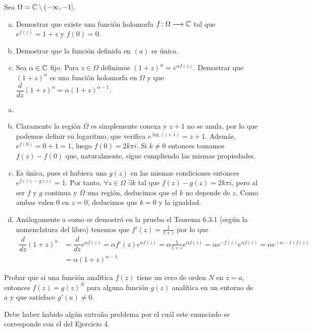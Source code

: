 \documentclass[twoside]{article}
\begin{document}
\begin{ejercicio}{8}
Sea $\Omega=\mathbb{C}\setminus(-\infty,-1]$. 
\begin{enumerate}[(a)]
\item Demostrar que existe una función holomorfa $f\colon{\Omega}\longrightarrow{\mathbb{C}}$ tal que $e^{f(z)}=1+z$ y $f(0)=0$.
\item Demostrar que la función definida en $(a)$ es única.
\item Sea $\alpha\in\mathbb{C}$ fijo. Para $z\in \Omega$ definimos $(1+z)^\alpha = e^{\alpha f(z)}$. Demostrar que $(1+z)^\alpha$ es una función holomorfa en $\Omega$ y que $\dfrac{d}{dz}(1+z)^\alpha = \alpha(1+z)^{\alpha-1}$. 
\end{enumerate}
\end{ejercicio}
\begin{solucion}
\begin{enumerate}[(a)]
\item[]
\item Claramente la región $\Omega$ es simplemente conexa y $z+1$ no se anula, por lo que podemos definir su logaritmo, que verifica $e^{\log (z+1)} = z+1$. Además, $e^{f(0)} = 0 +1 =1$, luego $f(0)=2k\pi i$. Si $k\neq 0$ entonces tomamos $f(z)-f(0)$ que, naturalmente, sigue cumpliendo las mismas propiedades.
\item Es única, pues si hubiera una $g(z)$ en las mismas condiciones entonces $e^{f(z)-g(z)} = 1$. Por tanto, $\forall z \in \Omega$ $\exists k$ tal que $f(z)-g(z)=2k\pi i$, pero al ser $f$ y $g$ continua y $\Omega$ una región, deducimos que el $k$ no depende de $z$. Como ambas valen $0$ en $z=0$, deducimos que $k=0$ y la igualdad.
\item Análogamente a como se demostró en la prueba el Teorema 6.3.1 (según la nomenclatura del libro) tenemos que $f'(z) = \frac{1}{1+z}$ por lo que
\begin{align*}
\dfrac{d}{dz}(1+z)^\alpha &=\dfrac{d}{dz} e^{\alpha f(z)} = \alpha f'(z) e^{\alpha f(z)} = \alpha\frac{1}{1+z}e^{\alpha f(z)} = \alpha e^{-f(z)} e^{\alpha f(z)} = \alpha e^{(\alpha-1)f(z)}\\
&= \alpha (1+z)^{\alpha-1}
\end{align*}
\end{enumerate}

\end{solucion}
\newpage


\begin{ejercicio}{9}
Probar que si una función analítica $f(z)$ tiene un cero de orden $N$ en $z=a$, entonces $f(z)=g(z)^N$ para alguna función $g(z)$ analítica en un entorno de $a$ y que satisface $g'(a)\neq 0$.
\end{ejercicio}
\begin{solucion}
Debe haber habido algún extraño problema por el cuál este enunciado se corresponde con el del Ejercicio 4.
\end{solucion}
\newpage
\end{document}
